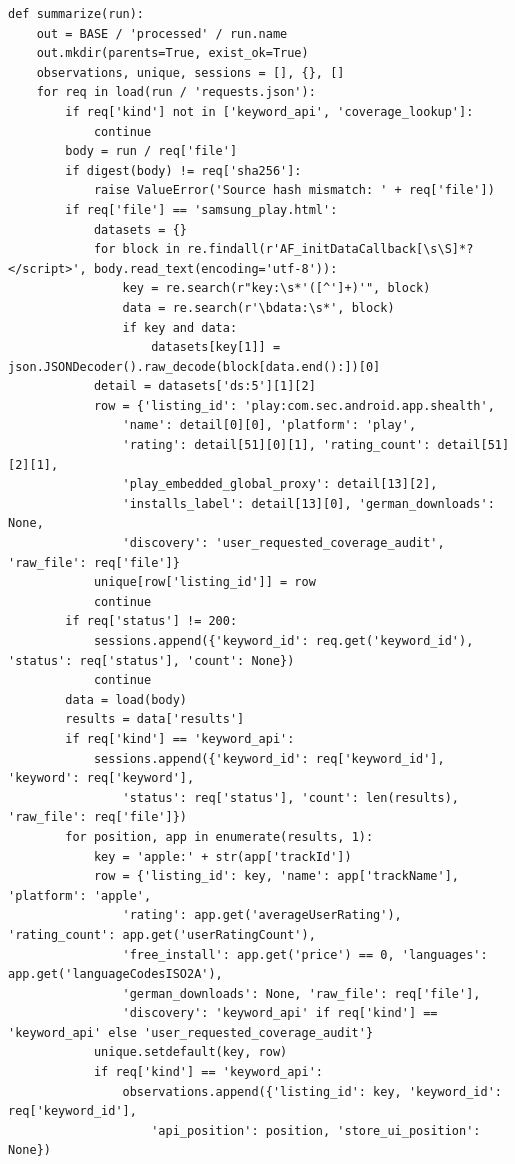 \documentclass[10pt,a4paper]{article}
\begin{document}
\begin{lstlisting}
def summarize(run):
    out = BASE / 'processed' / run.name
    out.mkdir(parents=True, exist_ok=True)
    observations, unique, sessions = [], {}, []
    for req in load(run / 'requests.json'):
        if req['kind'] not in ['keyword_api', 'coverage_lookup']:
            continue
        body = run / req['file']
        if digest(body) != req['sha256']:
            raise ValueError('Source hash mismatch: ' + req['file'])
        if req['file'] == 'samsung_play.html':
            datasets = {}
            for block in re.findall(r'AF_initDataCallback[\s\S]*?</script>', body.read_text(encoding='utf-8')):
                key = re.search(r"key:\s*'([^']+)'", block)
                data = re.search(r'\bdata:\s*', block)
                if key and data:
                    datasets[key[1]] = json.JSONDecoder().raw_decode(block[data.end():])[0]
            detail = datasets['ds:5'][1][2]
            row = {'listing_id': 'play:com.sec.android.app.shealth',
                'name': detail[0][0], 'platform': 'play',
                'rating': detail[51][0][1], 'rating_count': detail[51][2][1],
                'play_embedded_global_proxy': detail[13][2],
                'installs_label': detail[13][0], 'german_downloads': None,
                'discovery': 'user_requested_coverage_audit', 'raw_file': req['file']}
            unique[row['listing_id']] = row
            continue
        if req['status'] != 200:
            sessions.append({'keyword_id': req.get('keyword_id'), 'status': req['status'], 'count': None})
            continue
        data = load(body)
        results = data['results']
        if req['kind'] == 'keyword_api':
            sessions.append({'keyword_id': req['keyword_id'], 'keyword': req['keyword'],
                'status': req['status'], 'count': len(results), 'raw_file': req['file']})
        for position, app in enumerate(results, 1):
            key = 'apple:' + str(app['trackId'])
            row = {'listing_id': key, 'name': app['trackName'], 'platform': 'apple',
                'rating': app.get('averageUserRating'), 'rating_count': app.get('userRatingCount'),
                'free_install': app.get('price') == 0, 'languages': app.get('languageCodesISO2A'),
                'german_downloads': None, 'raw_file': req['file'],
                'discovery': 'keyword_api' if req['kind'] == 'keyword_api' else 'user_requested_coverage_audit'}
            unique.setdefault(key, row)
            if req['kind'] == 'keyword_api':
                observations.append({'listing_id': key, 'keyword_id': req['keyword_id'],
                    'api_position': position, 'store_ui_position': None})

\end{lstlisting}
\end{document}
